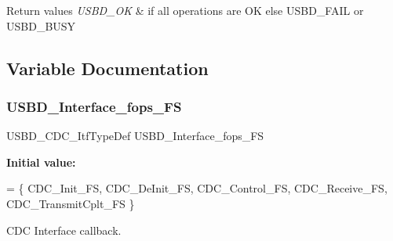 \begin{DoxyRetVals}{Return values}
{\em U\+S\+B\+D\+\_\+\+OK} & if all operations are OK else U\+S\+B\+D\+\_\+\+F\+A\+IL or U\+S\+B\+D\+\_\+\+B\+U\+SY \\
\hline
\end{DoxyRetVals}


\subsection{Variable Documentation}
\mbox{\label{group__USBD__CDC__IF_ga99394ed19b774f171df96c2848c411ed}} 
\subsubsection{\texorpdfstring{U\+S\+B\+D\+\_\+\+Interface\+\_\+fops\+\_\+\+FS}{USBD\_Interface\_fops\_FS}}
{\footnotesize\ttfamily U\+S\+B\+D\+\_\+\+C\+D\+C\+\_\+\+Itf\+Type\+Def U\+S\+B\+D\+\_\+\+Interface\+\_\+fops\+\_\+\+FS}

{\bfseries Initial value\+:}
\begin{DoxyCode}
=
\{
  CDC\_Init\_FS,
  CDC\_DeInit\_FS,
  CDC\_Control\_FS,
  CDC\_Receive\_FS,
  CDC\_TransmitCplt\_FS
\}
\end{DoxyCode}
C\+DC Interface callback. 